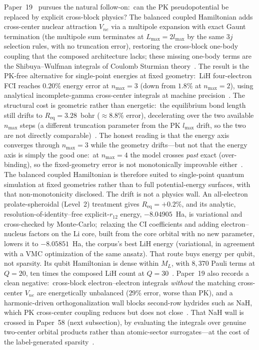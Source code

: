 \documentclass[aps,pra,twocolumn,superscriptaddress,longbibliography]{revtex4-2}
\begin{document}
Paper~19~\cite{loutey_paper19} pursues the natural follow-on:\ can the
PK pseudopotential be replaced by explicit cross-block physics?  The
balanced coupled Hamiltonian adds cross-center nuclear attraction
$V_{ne}$ via a multipole expansion with exact Gaunt termination
(the multipole sum terminates at $L_{\max} = 2 l_{\max}$ by the same
$3j$ selection rules, with no truncation error), restoring the
cross-block one-body coupling that the composed architecture
lacks; these missing one-body terms are the Shibuya--Wulfman integrals of Coulomb Sturmian theory~\cite{shibuya1965, loutey_paper19}.  The result is the PK-free alternative for
single-point energies at fixed geometry:\ LiH four-electron FCI reaches
$0.20\%$ energy error at $n_{\max}=3$ (down from $1.8\%$ at $n_{\max}=2$),
using analytical incomplete-gamma cross-center integrals at machine
precision~\cite{loutey_paper19}.  The structural cost is geometric
rather than energetic:\ the equilibrium bond length still drifts to
$R_{\mathrm{eq}} = 3.28$~bohr ($\approx 8.8\%$ error), decelerating over
the two available $n_{\max}$ steps (a different truncation parameter from
the PK $l_{\max}$ drift, so the two are not directly
comparable)~\cite{loutey_paper19}.  The honest reading is that
the energy axis converges through $n_{\max}=3$ while the geometry drifts---but
not that the energy axis is simply the good one:\ at $n_{\max}=4$ the model
crosses \emph{past} exact (over-binding), so the fixed-geometry error is not
monotonically improvable either~\cite{loutey_paper19}.  The balanced coupled
Hamiltonian is therefore suited to single-point quantum simulation at fixed
geometries rather than to full potential-energy surfaces, with that
non-monotonicity disclosed.  The drift is not a physics wall.  An all-electron
prolate-spheroidal (Level~2) treatment gives $R_{\mathrm{eq}}=+0.2\%$, and its
analytic, resolution-of-identity--free explicit-$r_{12}$ energy,
$-8.04905$~Ha, is variational and cross-checked by Monte-Carlo;\ relaxing
the CI coefficients and adding electron--nucleus factors on the Li core,
built from the core orbital with no new parameter, lowers it to
$-8.05851$~Ha, the corpus's best LiH energy (variational, in agreement
with a VMC optimization of the same ansatz).  That route buys energy per qubit, not sparsity.
Its qubit Hamiltonian is dense within $M_L$, with $8{,}370$ Pauli terms at
$Q=20$, ten times the composed LiH count at $Q=30$~\cite{loutey_paper19}.  Paper~19 also
records a clean
negative:\ cross-block electron--electron integrals \emph{without} the
matching cross-center $V_{ne}$ are energetically unbalanced ($29\%$
error, worse than PK), and a harmonic-driven orthogonalization wall
blocks second-row hydrides such as NaH, which PK cross-center coupling
reduces but does not close~\cite{loutey_paper19}.  That NaH wall is
crossed in Paper~58 (next subsection), by evaluating the integrals over
genuine two-center orbital products rather than atomic-sector
surrogates---at the cost of the label-generated
sparsity~\cite{loutey_paper58}.
\end{document}
